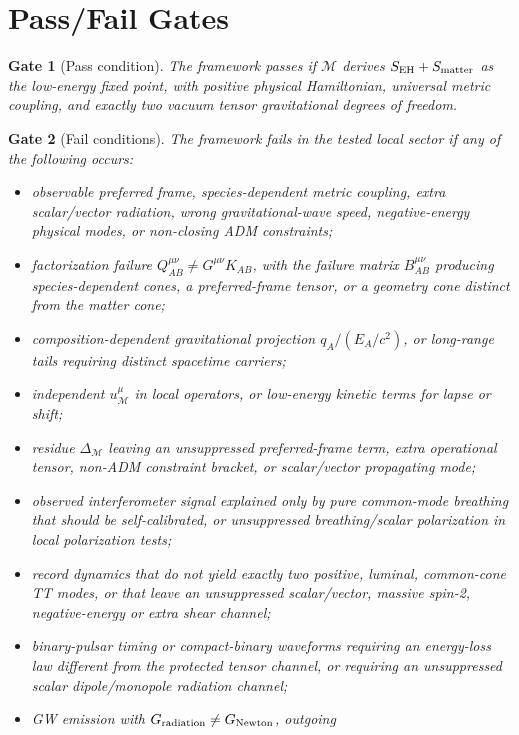 \documentclass[11pt]{article}
\newtheorem{gate}{Gate}
\begin{document}
\section{Pass/Fail Gates}

\begin{gate}[Pass condition]
The framework passes if $\mathcal M$ derives $S_{\rm EH}+S_{\rm matter}$ as
the low-energy fixed point, with positive physical Hamiltonian, universal
metric coupling, and exactly two vacuum tensor gravitational degrees of
freedom.
\end{gate}

\begin{gate}[Fail conditions]
The framework fails in the tested local sector if any of the following
occurs:
\begin{itemize}
\item observable preferred frame, species-dependent metric coupling, extra
  scalar/vector radiation, wrong gravitational-wave speed, negative-energy
  physical modes, or non-closing ADM constraints;
\item factorization failure $Q_{AB}^{\mu\nu}\neq G^{\mu\nu}K_{AB}$, with the
  failure matrix $B_{AB}^{\mu\nu}$ producing species-dependent cones, a
  preferred-frame tensor, or a geometry cone distinct from the matter cone;
\item composition-dependent gravitational projection $q_A/(E_A/c^2)$, or
  long-range tails requiring distinct spacetime carriers;
\item independent $u^\mu_{\mathcal M}$ in local operators, or low-energy
  kinetic terms for lapse or shift;
\item residue $\Delta_{\mathcal M}$ leaving an unsuppressed preferred-frame
  term, extra operational tensor, non-ADM constraint bracket, or scalar/vector
  propagating mode;
\item observed interferometer signal explained only by pure common-mode
  breathing that should be self-calibrated, or unsuppressed breathing/scalar
  polarization in local polarization tests;
\item record dynamics that do not yield exactly two positive, luminal,
  common-cone TT modes, or that leave an unsuppressed scalar/vector,
  massive spin-2, negative-energy or extra shear channel;
\item binary-pulsar timing or compact-binary waveforms requiring an
  energy-loss law different from the protected tensor channel, or requiring
  an unsuppressed scalar dipole/monopole radiation channel;
\item GW emission with \(G_{\rm radiation}\neq G_{\rm Newton}\), outgoing

\end{itemize}
\end{gate}
\end{document}

